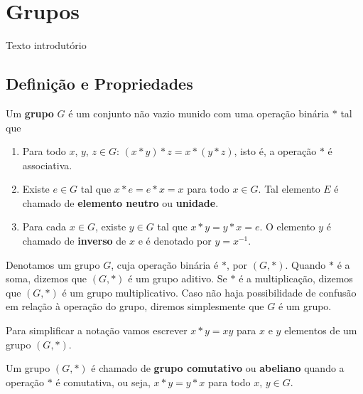 
\chapter{Grupos} %
\label{cha:Grupos}


Texto introdut\'orio%


\section{Defini{\c c}{\~a}o e Propriedades}%
\label{sec:definicao_e_propriedades}
\begin{definicao}
	Um \textbf{grupo} $G$ {\'e} um conjunto n{\~a}o vazio munido com uma opera{\c c}{\~a}o bin{\'a}ria $*$ tal que
	\begin{enumerate}[label=({\roman*})]
		\item Para todo $x$, $y$, $z\in G$: $(x*y)*z=x*(y*z)$, isto \'e, a opera\c{c}\~ao $*$ \'e associativa.
		\item Existe $e\in G$ tal que $x*e=e*x=x$ para todo $x\in G$. Tal elemento $E$ {\'e} chamado de \textbf{elemento neutro} ou \textbf{unidade}.
		\item Para cada $x\in G$, existe $y\in G$ tal que $x*y=y*x=e$. O elemento $y$ {\'e} chamado de \textbf{inverso} de $x$ e \'e denotado por $y = x^{-1}$.
	\end{enumerate}
\end{definicao}

Denotamos um grupo $G$, cuja opera{\c c}{\~a}o bin{\'a}ria {\'e} $*$, por $(G,*)$. Quando $*$ {\'e} a soma, dizemos que $(G,*)$ {\'e} um grupo aditivo. Se $*$ {\'e} a multiplica{\c c}{\~a}o, dizemos que $(G,*)$ {\'e} um grupo multiplicativo. Caso n\~ao haja possibilidade de confus\~ao em rela\c{c}\~ao \`a opera\c{c}\~ao do grupo, diremos simplesmente que $G$ \'e um grupo.

\begin{observacao}
	Para simplificar a nota\c{c}\~ao vamos escrever $x * y = xy$ para $x$ e $y$ elementos de um grupo $(G, *)$.
\end{observacao}
\begin{definicao}Um grupo $(G,*)$ {\'e} chamado de \textbf{grupo comutativo} ou \textbf{abeliano} quando a opera\c{c}\~ao $*$ {\'e} comutativa, ou seja, $x*y=y*x$ para todo $x$, $y\in G$.
\end{definicao}

